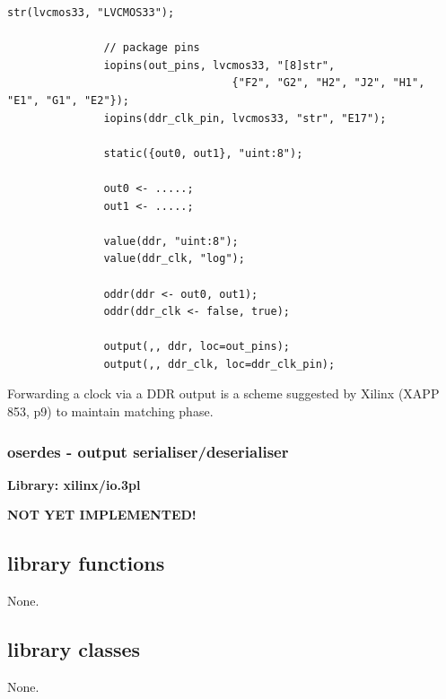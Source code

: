             \begin{lstlisting}[gobble=12, language=threepl]
               str(lvcmos33, "LVCMOS33");

               // package pins
               iopins(out_pins, lvcmos33, "[8]str",
                                   {"F2", "G2", "H2", "J2", "H1", "E1", "G1", "E2"});
               iopins(ddr_clk_pin, lvcmos33, "str", "E17");

               static({out0, out1}, "uint:8");
               
               out0 <- .....;
               out1 <- .....;
               
               value(ddr, "uint:8");
               value(ddr_clk, "log");
               
               oddr(ddr <- out0, out1);
               oddr(ddr_clk <- false, true);
               
               output(,, ddr, loc=out_pins);
               output(,, ddr_clk, loc=ddr_clk_pin);
            \end{lstlisting}
            
            Forwarding a clock via a DDR output is a scheme suggested by
            Xilinx (XAPP 853, p9) to maintain matching phase.



        \subsubsection{oserdes - output serialiser/deserialiser}\label{sec:lposerdes}

            {\bf Library: xilinx/io.3pl}

            {\bf NOT YET IMPLEMENTED!}




    \subsection{library functions}
    
        None.





    \subsection{library classes}
    
        None.
